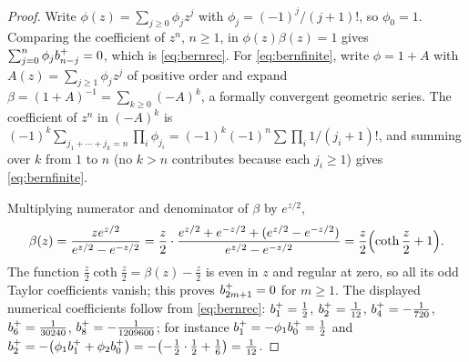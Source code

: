 \begin{proof}
Write $\phi(z)=\sum_{j\geq0}\phi_jz^j$ with $\phi_j=(-1)^j/(j+1)!$, so
$\phi_0=1$. Comparing the coefficient of $z^n$, $n\geq1$, in
$\phi(z)\beta(z)=1$ gives $\sum_{j=0}^n\phi_jb^{+}_{n-j}=0$, which is
\eqref{eq:bernrec}. For \eqref{eq:bernfinite}, write $\phi=1+A$ with
$A(z)=\sum_{j\geq1}\phi_jz^j$ of positive order and expand
$\beta=(1+A)^{-1}=\sum_{k\geq0}(-A)^k$, a formally convergent geometric
series. The coefficient of $z^n$ in $(-A)^k$ is
$(-1)^k\sum_{j_1+\cdots+j_k=n}\prod_i\phi_{j_i}
=(-1)^k(-1)^n\sum\prod_i1/(j_i+1)!$, and summing over $k$ from $1$ to $n$
(no $k>n$ contributes because each $j_i\geq1$) gives \eqref{eq:bernfinite}.

Multiplying numerator and denominator of $\beta$ by $e^{z/2}$,
\[
 \beta(z)=\frac{ze^{z/2}}{e^{z/2}-e^{-z/2}}
 =\frac z2\cdot\frac{e^{z/2}+e^{-z/2}+(e^{z/2}-e^{-z/2})}{e^{z/2}-e^{-z/2}}
 =\frac z2\Bigl(\coth\frac z2+1\Bigr).
\]
The function $\frac z2\coth\frac z2=\beta(z)-\frac z2$ is even in $z$ and
regular at zero, so all its odd Taylor coefficients vanish; this proves
$b^{+}_{2m+1}=0$ for $m\geq1$. The displayed numerical coefficients follow
from \eqref{eq:bernrec}: $b^{+}_{1}=\tfrac12$, $b^{+}_{2}=\tfrac1{12}$,
$b^{+}_{4}=-\tfrac1{720}$, $b^{+}_{6}=\tfrac1{30240}$,
$b^{+}_{8}=-\tfrac1{1209600}$; for instance
$b^{+}_{1}=-\phi_1b^{+}_{0}=\tfrac12$ and
$b^{+}_{2}=-\bigl(\phi_1b^{+}_{1}+\phi_2b^{+}_{0}\bigr)
=-\bigl(-\tfrac12\cdot\tfrac12+\tfrac16\bigr)=\tfrac1{12}$.


\end{proof}
